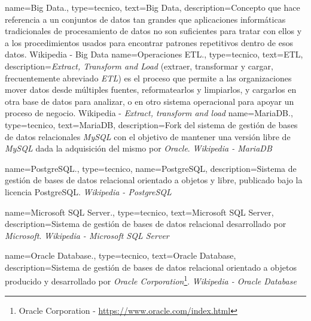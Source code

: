 {
    name={Big Data.},
  	type=tecnico,
    text={Big Data},
    description={Concepto que hace referencia a un conjuntos de datos tan grandes que aplicaciones informáticas tradicionales de procesamiento de datos no son suficientes para tratar con ellos y a los procedimientos usados para encontrar patrones repetitivos dentro de esos datos. {Wikipedia - Big Data} \cite{wikibigdata}}
}
{
    name={Operaciones ETL.},
  	type=tecnico,
    text={ETL},
    description={\textit{Extract, Transform and Load} (extraer, transformar y cargar, frecuentemente abreviado \textit{ETL}) es el proceso que permite a las organizaciones mover datos desde múltiples fuentes, reformatearlos y limpiarlos, y cargarlos en otra base de datos para analizar, o en otro sistema operacional para apoyar un proceso de negocio. {Wikipedia - \textit{Extract, transform and load}} \cite{wikietl}}
}
{
    name={MariaDB.},
  	type=tecnico,
    text={MariaDB},
    description={Fork del sistema de gestión de bases de datos relacionales \textit{MySQL} con el objetivo de mantener una versión libre de \textit{MySQL} dada la adquisición del mismo por \textit{Oracle}. \textit{Wikipedia - MariaDB} \cite{wikimariadb}}
}

{
    name={PostgreSQL.},
  	type=tecnico,
    name={PostgreSQL},
    description={Sistema de gestión de bases de datos relacional orientado a objetos y libre, publicado bajo la licencia PostgreSQL. \textit{Wikipedia - PostgreSQL} \cite{wikipostgresql}}
}

{
    name={Microsoft SQL Server.},
  	type=tecnico,
    text={Microsoft SQL Server},
    description={Sistema de gestión de bases de datos relacional desarrollado por \textit{Microsoft}. \textit{Wikipedia - Microsoft SQL Server} \cite{wikimssql}}
}

{
    name={Oracle Database.},
  	type=tecnico,
    text={Oracle Database},
    description={Sistema de gestión de bases de datos relacional orientado a objetos producido y desarrollado por \textit{Oracle Corporation}\footnote{Oracle Corporation - \url{https://www.oracle.com/index.html}}. \textit{Wikipedia - Oracle Database} \cite{wikioracle}}
}





